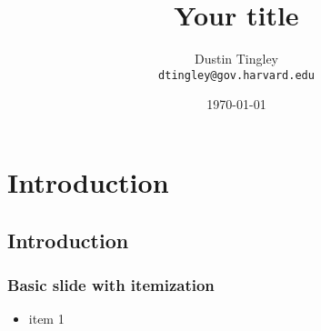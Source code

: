 \documentclass[compress, xcolor=pst]{beamer}
\title{Your title}
\author[]{Dustin Tingley\\ \texttt{dtingley@gov.harvard.edu}}
\institute{Department of Government, Harvard University}
\date{\today}
\newcommand\spacingset[1]{\renewcommand{\baselinestretch}%
{#1}\small\normalsize}
\begin{document}
 
\frame{\titlepage}
 
 
\section{Introduction}
\subsection{Introduction}
\begin{frame}
    \frametitle{\textbf{Basic slide with itemization}}
    \begin{itemize}
 \medskip
\item  item 1
 
\end{itemize}
\end{frame}
 
 
 
 
 
\begin{comment}
\begin{frame}
\frametitle{\textbf{Include a graphic}}
\begin{figure}[htb]
\spacingset{1}
\centerline{\texttt{[image: data/postprocessing/AvatarSelectionPlot-Role2.pdf]}}
\end{figure}
\end{frame}
\end{comment}
 
 
\begin{comment}
\begin{frame}[allowframebreaks]
\def\newblock{}

\end{frame}
\end{comment}
 
 
 
\end{document}
